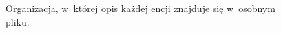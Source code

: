 \begin{figure}[!ht]

\caption{Organizacja, w~której opis każdej encji znajduje się w~osobnym pliku.}
\label{fig:single:fileStructure_chosen}
\end{figure}

